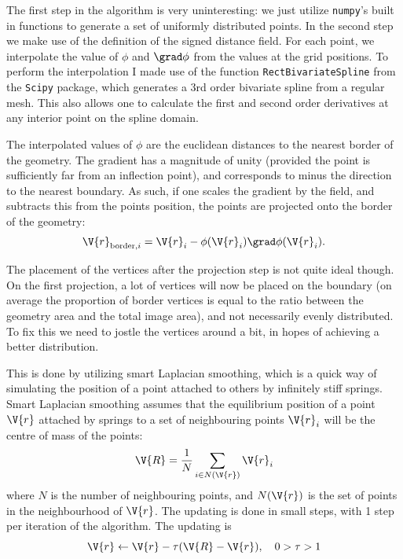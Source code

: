 \documentclass[sigconf]{acmart}
\begin{document}
The first step in the algorithm is very uninteresting: we just utilize \texttt{numpy}'s built in functions to generate a set of uniformly distributed points. In the second step we make use of the definition of the signed distance field. For each point, we interpolate the value of $ \phi $ and $ \grad \phi $ from the values at the grid positions. To perform the interpolation I made use of the function \texttt{RectBivariateSpline} from the \texttt{Scipy} package, which generates a 3rd order bivariate spline from a regular mesh. This also allows one to calculate the first and second order derivatives at any interior point on the spline domain.

The interpolated values of $ \phi $ are the euclidean distances to the nearest border of the geometry. The gradient has a magnitude of unity (provided the point is sufficiently far from an inflection point), and corresponds to minus the direction to the nearest boundary. As such, if one scales the gradient by the field, and subtracts this from the points position, the points are projected onto the border of the geometry:
\begin{equation}\label{key}
	\V{r}_{\text{border}, i} = \V{r}_{i} - \phi(\V{r}_i) \grad\phi(\V{r}_i).
\end{equation}

The placement of the vertices after the projection step is not quite ideal though. On the first projection, a lot of vertices will now be placed on the boundary (on average the proportion of border vertices is equal to the ratio between the geometry area and the total image area), and not necessarily evenly distributed. To fix this we need to jostle the vertices around a bit, in hopes of achieving a better distribution.

This is done by utilizing smart Laplacian smoothing, which is a quick way of simulating the position of a point attached to others by infinitely stiff springs. Smart Laplacian smoothing assumes that the equilibrium position of a point $ \V{r} $ attached by springs to a set of neighbouring points $ \V{r}_i $ will be the centre of mass of the points:
\begin{equation}\label{key}
	\V{R} = \frac{1}{N} \sum_{i \in N(\V{r})} \V{r}_i
\end{equation}
where $ N $ is the number of neighbouring points, and $ N(\V{r}) $ is the set of points in the neighbourhood of $ \V{r} $. The updating is done in small steps, with 1 step per iteration of the algorithm. The updating is
\begin{equation}\label{key}
	\V{r} \leftarrow \V{r} - \tau(\V{R} - \V{r}), \quad 0 > \tau > 1
\end{equation}
\end{document}

